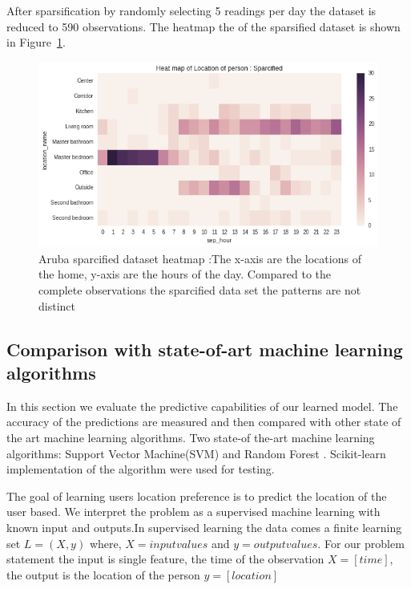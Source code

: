After sparsification by randomly selecting 5 readings per day the dataset is reduced to 590 observations. The heatmap the of the sparsified dataset is shown in Figure~\ref{aruba-reduced-hist}. 

\begin{figure}[htp]
\centering
\includegraphics[width=\textwidth]{images/aruba-reduced-heatmap.png}
\caption[Aruba sparcified dataset heatmap]{Aruba sparcified dataset heatmap :The x-axis are the locations of the home, y-axis are the hours of the day. Compared to the complete observations the sparcified data set the patterns are not distinct}
\label{aruba-reduced-hist}
\end{figure}

\FloatBarrier


\subsection{Comparison with state-of-art machine learning algorithms}

In this section we evaluate the predictive capabilities of our learned model. The accuracy of the predictions are measured and then compared with other state of the art machine learning algorithms. Two state-of the-art machine learning algorithms: Support Vector Machine(SVM)\cite{boser1992training, cortes1995support} and Random Forest \cite{breiman2001random, geurts2006extremely}. Scikit-learn \cite{sklearn_api} implementation of the algorithm were used for testing.

The goal of learning users location preference is to predict the location of the user based. We interpret the problem as a supervised machine learning with known input and outputs.In supervised learning the data comes a finite learning set $L = (X, y)$ where, $X = input values$ and $y = output values$. 
For our problem statement the input is single feature, the time of the observation $X = [time]$, the output is the location of the person $y=[location]$

